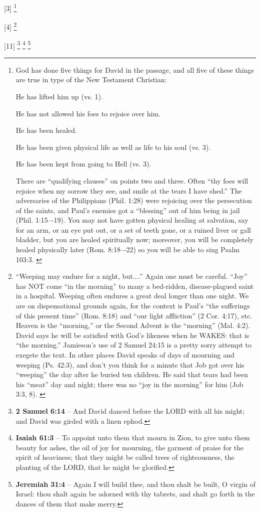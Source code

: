 
[3] \footnote{God has done five things for David in the passage, and all five of these things are true in type of the New Testament Christian:
\begin{compactenum}
	\item He has lifted him up (vs. 1).
	\item He has not allowed his foes to rejoice over him. 
	\item He has been healed. 
	\item He has been given physical life as well as life to his soul (vs. 3). 
	\item He has been kept from going to Hell (vs. 3). 
\end{compactenum}
There are “qualifying clauses” on points two and three. Often ``thy foes will rejoice when my sorrow they see, and smile at the tears I have shed.'' The adversaries of the Philippians (Phil. 1:28) were rejoicing over the persecution of the saints, and Paul’s enemies got a ``blessing'' out of him being in jail (Phil. 1:15–-19). You may not have gotten physical healing at salvation, say for an arm, or an eye put out, or a set of teeth gone, or a ruined liver or gall bladder, but you are healed spiritually now; moreover, you will be completely healed physically later (Rom. 8:18–-22) so you will be able to sing Psalm 103:3. \cite{Ruckman1992Psalms} }

[4] \footnote{“Weeping may endure for a night, but....” Again one must be careful. “Joy” has NOT come “in the morning” to many a bed-ridden, disease-plagued saint in a hospital. Weeping often endures a great deal longer than one night. We are on dispensational grounds again, for the context is Paul’s “the sufferings of this present time” (Rom. 8:18) and “our light affliction” (2 Cor. 4:17), etc. Heaven is the “morning,” or the Second Advent is the “morning” (Mal. 4:2). David says he will be satisfied with God’s likeness when he WAKES: that is “the morning.” Jamieson’s use of 2 Samuel 24:15 is a pretty sorry attempt to exegete the text. In other places David speaks of days of mourning and weeping (Ps. 42:3), and don’t you think for a minute that Job got over his “weeping” the day after he buried ten children. He said that tears had been his “meat” day and night; there was no “joy in the morning” for him (Job 3:3, 8). \cite{Ruckman1992Psalms}}

[11] \footnote{\textbf{2 Samuel 6:14} -- And David danced before the LORD with all his might; and David was girded with a linen ephod.} \footnote{\textbf{Isaiah 61:3} -- To appoint unto them that mourn in Zion, to give unto them beauty for ashes, the oil of joy for mourning, the garment of praise for the spirit of heaviness; that they might be called trees of righteousness, the planting of the LORD, that he might be glorified.} \footnote{\textbf{Jeremiah 31:4} -- Again I will build thee, and thou shalt be built, O virgin of Israel: thou shalt again be adorned with thy tabrets, and shalt go forth in the dances of them that make merry.}

